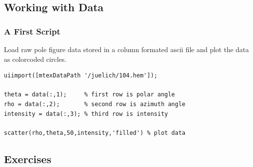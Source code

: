 \documentclass{beamer}
\begin{document}
\subsection{Working with Data}


\begin{frame}[fragile]
  \frametitle{A First Script}
  
Load raw pole figure data stored in a column formated ascii file and plot the
data as colorcoded circles.

\begin{lstlisting}
uiimport([mtexDataPath '/juelich/104.hem']);

theta = data(:,1);     % first row is polar angle
rho = data(:,2);       % second row is azimuth angle
intensity = data(:,3); % third row is intensity

scatter(rho,theta,50,intensity,'filled') % plot data

\end{lstlisting}


\end{frame}


\subsection*{Exercises}
\end{document}
